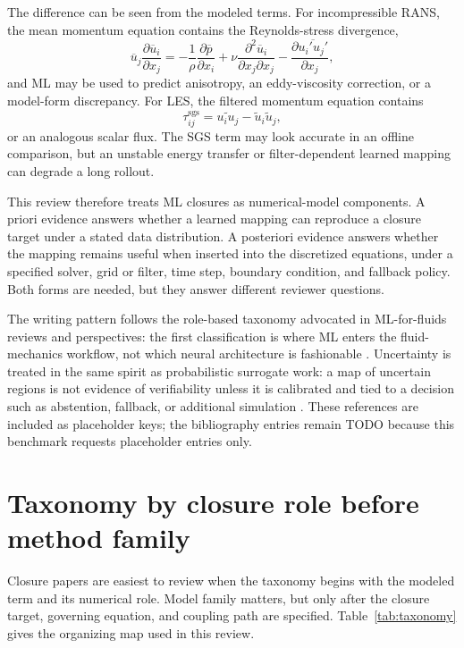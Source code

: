 \documentclass[11pt]{article}
\begin{document}
The difference can be seen from the modeled terms. For incompressible RANS, the mean momentum equation contains the Reynolds-stress divergence,
\begin{equation}
\overline{u}_j \frac{\partial \overline{u}_i}{\partial x_j}
= -\frac{1}{\rho}\frac{\partial \overline{p}}{\partial x_i}
+ \nu \frac{\partial^2 \overline{u}_i}{\partial x_j \partial x_j}
- \frac{\partial \overline{u_i' u_j'}}{\partial x_j},
\label{eq:rans}
\end{equation}
and ML may be used to predict anisotropy, an eddy-viscosity correction, or a model-form discrepancy. For LES, the filtered momentum equation contains
\begin{equation}
\tau_{ij}^{\mathrm{sgs}} =
\widetilde{u_i u_j} - \tilde{u}_i \tilde{u}_j,
\label{eq:sgs}
\end{equation}
or an analogous scalar flux. The SGS term may look accurate in an offline comparison, but an unstable energy transfer or filter-dependent learned mapping can degrade a long rollout.

This review therefore treats ML closures as numerical-model components. A priori evidence answers whether a learned mapping can reproduce a closure target under a stated data distribution. A posteriori evidence answers whether the mapping remains useful when inserted into the discretized equations, under a specified solver, grid or filter, time step, boundary condition, and fallback policy. Both forms are needed, but they answer different reviewer questions.

The writing pattern follows the role-based taxonomy advocated in ML-for-fluids reviews and perspectives: the first classification is where ML enters the fluid-mechanics workflow, not which neural architecture is fashionable \cite{brunton2020,brunton2021,vinuesa2022}. Uncertainty is treated in the same spirit as probabilistic surrogate work: a map of uncertain regions is not evidence of verifiability unless it is calibrated and tied to a decision such as abstention, fallback, or additional simulation \cite{maulik2020}. These references are included as placeholder keys; the bibliography entries remain TODO because this benchmark requests placeholder entries only.

\section{Taxonomy by closure role before method family}

Closure papers are easiest to review when the taxonomy begins with the modeled term and its numerical role. Model family matters, but only after the closure target, governing equation, and coupling path are specified. Table~\ref{tab:taxonomy} gives the organizing map used in this review.
\end{document}
